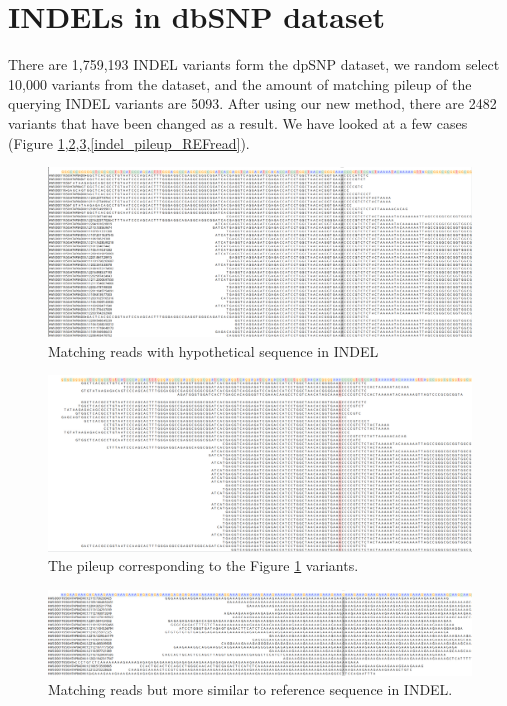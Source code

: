 \section{INDELs in dbSNP dataset}

There are 1,759,193 INDEL variants form the dpSNP dataset, we random select 10,000 variants from the dataset, and the amount of matching pileup of the querying INDEL variants are 5093. After using our new method, there are 2482 variants that have been changed as a result.  We have looked at a few cases  (Figure \ref{indel_new_ALTread},\ref{indel_pileup_ALTread},\ref{indel_new_REFread},\ref{indel_pileup_REFread}).

\begin{figure}[H]
\centering
\includegraphics[width=1\columnwidth]{body/image/indel_new_ALTread.png}
\caption[INDEL match reads]{Matching reads with hypothetical sequence in INDEL}
\label{indel_new_ALTread}
\end{figure}

\begin{figure}[H]
\centering
\includegraphics[width=1\columnwidth]{body/image/indel_pileup_ALTread.png}
\caption[Figure 4.22 pileup]{The pileup corresponding to the Figure \ref{indel_new_ALTread} variants.}
\label{indel_pileup_ALTread}
\end{figure}

\begin{figure}[H]
\centering
\includegraphics[width=1\columnwidth]{body/image/indel_new_REFread.png}
\caption[INDEL worse match reads]{Matching reads but more similar to reference sequence in INDEL.}
\label{indel_new_REFread}
\end{figure}

